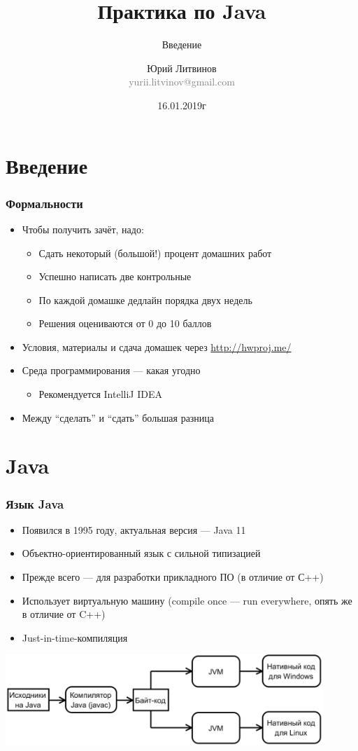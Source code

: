 \documentclass[xetex,mathserif,serif]{beamer}
\title{Практика по Java}
\subtitle{Введение}
\author[Юрий Литвинов]{Юрий Литвинов\\\small{\textcolor{gray}{yurii.litvinov@gmail.com}}}
\date{16.01.2019г}
\begin{document}
	\frame{\titlepage}

	\section{Введение}

	\begin{frame}
		\frametitle{Формальности}
		\begin{itemize}
			\item Чтобы получить зачёт, надо:
			\begin{itemize}
				\item Сдать некоторый (большой!) процент домашних работ
				\item Успешно написать две контрольные
				\item По каждой домашке дедлайн порядка двух недель
				\item Решения оцениваются от 0 до 10 баллов
			\end{itemize}
			\item Условия, материалы и сдача домашек через \url{http://hwproj.me/}
			\item Среда программирования --- какая угодно
			\begin{itemize}
				\item Рекомендуется IntelliJ IDEA
			\end{itemize}
			\item Между ``сделать'' и ``сдать'' большая разница
		\end{itemize}
	\end{frame}

	\section{Java}

	\begin{frame}
		\frametitle{Язык Java}
		\begin{itemize}
			\item Появился в 1995 году, актуальная версия --- Java 11
			\item Объектно-ориентированный язык с сильной типизацией
			\item Прежде всего --- для разработки прикладного ПО (в отличие от С++)
			\item Использует виртуальную машину (compile once --- run everywhere, опять же в отличие от C++)
			\item Just-in-time-компиляция
		\end{itemize}
		\begin{center}
			\includegraphics[width=0.9\textwidth]{javaCompiling.png}
		\end{center}
	\end{frame}
\end{document}
